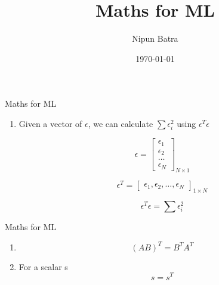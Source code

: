 \documentclass{beamer}
\title{Maths for ML}
\date{\today}
\author{Nipun Batra}
\institute{IIT Gandhinagar}
\newcounter{saveenumi}
\newcommand{\seti}{\setcounter{saveenumi}{\value{enumi}}}
\newcommand{\conti}{\setcounter{enumi}{\value{saveenumi}}}
\begin{document}
  \maketitle
  
  
  

\begin{frame}{Maths for ML}
\begin{enumerate}
	\item Given a vector of $\epsilon$, we can calculate $\sum \epsilon_{i}^{2}$ using $\epsilon^{T}\epsilon$
	
	\pause $$
	\epsilon = \begin{bmatrix}
	\epsilon_{1}   \\
	\epsilon_{2}   \\
	\dots \\
	\epsilon_{N}
	\end{bmatrix}_{N \times 1}   
	$$
	
	\pause $$
	\epsilon^T = \begin{bmatrix}
	\epsilon_{1}, 
	\epsilon_{2},  
	\dots, 
	\epsilon_{N}
	\end{bmatrix}_{1 \times N}   
	$$
	
	\pause $$\epsilon^T\epsilon = \sum \epsilon_{i}^{2}$$
	    \seti
	
\end{enumerate}



\end{frame}

\begin{frame}{Maths for ML}
\begin{enumerate}
	\conti
	\item $$
	(AB)^{T} = B^{T}A^{T}    
	$$
	\pause \item 
	For a scalar s
	$$
	s = s^{T}    
	$$
	\seti
\end{enumerate}


\end{frame}
\end{document}
